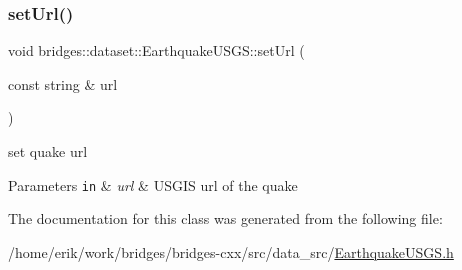 \subsubsection{\texorpdfstring{set\+Url()}{setUrl()}}
{\footnotesize\ttfamily void bridges\+::dataset\+::\+Earthquake\+U\+S\+G\+S\+::set\+Url (\begin{DoxyParamCaption}\item[{const string \&}]{url }\end{DoxyParamCaption})\hspace{0.3cm}{\ttfamily [inline]}}



set quake url 


\begin{DoxyParams}[1]{Parameters}
\mbox{\tt in}  & {\em url} & U\+S\+G\+IS url of the quake \\
\hline
\end{DoxyParams}


The documentation for this class was generated from the following file\+:\begin{DoxyCompactItemize}
\item 
/home/erik/work/bridges/bridges-\/cxx/src/data\+\_\+src/\hyperlink{_earthquake_u_s_g_s_8h}{Earthquake\+U\+S\+G\+S.\+h}\end{DoxyCompactItemize}

